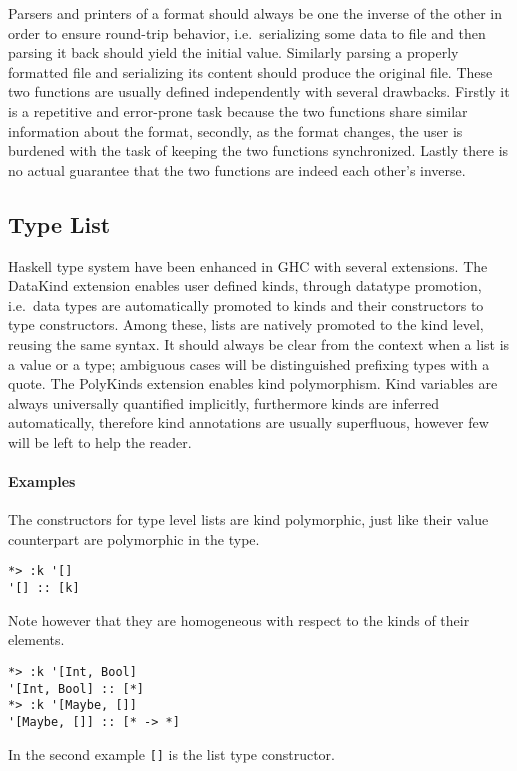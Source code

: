\documentclass[../Thesis.tex]{subfiles}
\begin{document}
Parsers and printers of a format should always be one the inverse of the other in order to ensure round-trip behavior, i.e.\ 
serializing some data to file and then parsing it back
should yield the initial value. Similarly parsing a properly formatted file and serializing its content should produce the original file.
These two functions are usually defined independently with several drawbacks. Firstly it is a repetitive and error-prone task because the two functions share similar information about the format, secondly, as the format changes, the user is burdened with the task of keeping the two functions synchronized. Lastly there is no actual guarantee that the two functions are indeed each other's inverse.

	\subsection{Type List}
	\label{subsec:TypeList}
	Haskell type system have been enhanced in GHC with
	several extensions. The DataKind extension enables
	user defined kinds, through datatype promotion, i.e.\
	data types are automatically promoted to kinds and
	their constructors to type constructors.
	Among these, lists are natively promoted to the kind level,
	reusing the same syntax.
	It should always be clear from the context
	when a list is a value or a type; ambiguous cases
	will be distinguished prefixing types with a quote.
	The PolyKinds extension enables kind polymorphism.
	Kind variables are always universally quantified implicitly,
	furthermore kinds are inferred automatically,
	therefore kind annotations are usually superfluous, 
	however few will be left to help the reader.
	
	\paragraph{Examples}
	The constructors for type level lists are kind polymorphic,
	just like their value counterpart are polymorphic in the type.
\begin{verbatim}
*> :k '[]
'[] :: [k]
\end{verbatim}

	Note however that they are homogeneous with respect to the kinds of 
	their elements.
\begin{verbatim}
*> :k '[Int, Bool]
'[Int, Bool] :: [*]
*> :k '[Maybe, []]
'[Maybe, []] :: [* -> *]
\end{verbatim}
	In the second example \texttt{[]} is the list type constructor.
	
\end{document}

